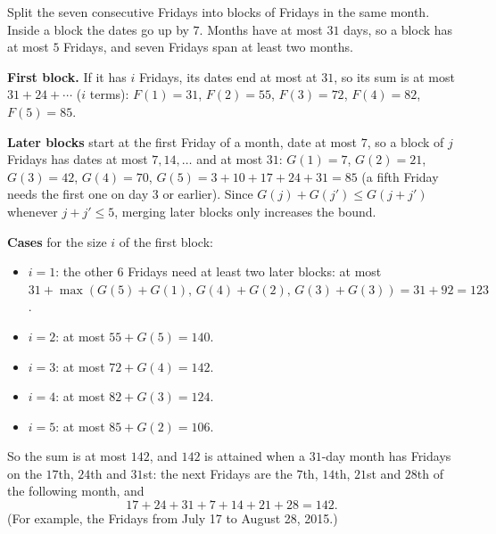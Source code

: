 Split the seven consecutive Fridays into blocks of Fridays in the same month. Inside a block the dates go up by $7$. Months have at most $31$ days, so a block has at most $5$ Fridays, and seven Fridays span at least two months.

\textbf{First block.} If it has $i$ Fridays, its dates end at most at $31$, so its sum is at most $31+24+\cdots$ ($i$ terms): $F(1)=31$, $F(2)=55$, $F(3)=72$, $F(4)=82$, $F(5)=85$.

\textbf{Later blocks} start at the first Friday of a month, date at most $7$, so a block of $j$ Fridays has dates at most $7,14,\dots$ and at most $31$: $G(1)=7$, $G(2)=21$, $G(3)=42$, $G(4)=70$, $G(5)=3+10+17+24+31=85$ (a fifth Friday needs the first one on day $3$ or earlier). Since $G(j)+G(j')\le G(j+j')$ whenever $j+j'\le5$, merging later blocks only increases the bound.

\textbf{Cases} for the size $i$ of the first block:
\begin{itemize}
\item $i=1$: the other $6$ Fridays need at least two later blocks: at most $31+\max(G(5)+G(1),\,G(4)+G(2),\,G(3)+G(3))=31+92=123$.
\item $i=2$: at most $55+G(5)=140$.
\item $i=3$: at most $72+G(4)=142$.
\item $i=4$: at most $82+G(3)=124$.
\item $i=5$: at most $85+G(2)=106$.
\end{itemize}
So the sum is at most $142$, and $142$ is attained when a $31$-day month has Fridays on the $17$th, $24$th and $31$st: the next Fridays are the $7$th, $14$th, $21$st and $28$th of the following month, and
\[
17+24+31+7+14+21+28=\boxed{142}.
\]
(For example, the Fridays from July 17 to August 28, 2015.)
